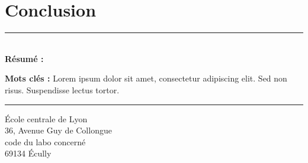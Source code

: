 \documentclass[a4paper,12pt,french]{article}
\begin{document}
\section{Conclusion}

\lipsum[1]


\newpage
\thispagestyle{empty}

\vspace*{\fill}
\noindent\rule[2pt]{\textwidth}{0.5pt}\\
{\textbf{Résumé :}}
\lipsum[1]

{\noindent\textbf{Mots clés :}}
Lorem ipsum dolor sit amet, consectetur adipiscing elit. Sed non risus. Suspendisse lectus tortor.
\\
\noindent\rule[2pt]{\textwidth}{0.5pt}
\begin{center}
  École centrale de Lyon\\
  36, Avenue Guy de Collongue\\
  code du labo concerné\\
  69134 Écully
\end{center}
\vspace*{\fill}
\end{document}

